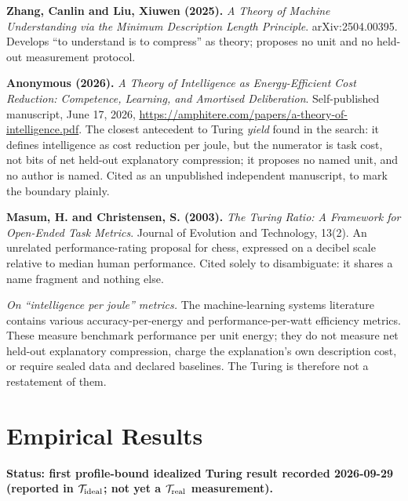 \documentclass[11pt]{article}
\begin{document}
\textbf{Zhang, Canlin and Liu, Xiuwen (2025).} \textit{A Theory of Machine Understanding via the Minimum Description Length Principle}. arXiv:2504.00395. Develops ``to understand is to compress'' as theory; proposes no unit and no held-out measurement protocol.

\textbf{Anonymous (2026).} \textit{A Theory of Intelligence as Energy-Efficient Cost Reduction: Competence, Learning, and Amortised Deliberation}. Self-published manuscript, June 17, 2026, \url{https://amphitere.com/papers/a-theory-of-intelligence.pdf}. The closest antecedent to Turing \textit{yield} found in the search: it defines intelligence as cost reduction per joule, but the numerator is task cost, not bits of net held-out explanatory compression; it proposes no named unit, and no author is named. Cited as an unpublished independent manuscript, to mark the boundary plainly.

\textbf{Masum, H. and Christensen, S. (2003).} \textit{The Turing Ratio: A Framework for Open-Ended Task Metrics}. Journal of Evolution and Technology, 13(2). An unrelated performance-rating proposal for chess, expressed on a decibel scale relative to median human performance. Cited solely to disambiguate: it shares a name fragment and nothing else.

\textit{On ``intelligence per joule'' metrics.} The machine-learning systems literature contains various accuracy-per-energy and performance-per-watt efficiency metrics. These measure benchmark performance per unit energy; they do not measure net held-out explanatory compression, charge the explanation's own description cost, or require sealed data and declared baselines. The Turing is therefore not a restatement of them.

\section{Empirical Results}

\textbf{Status: first profile-bound idealized Turing result recorded 2026-09-29 (reported in \(\mathcal{T}_{\rm ideal}\); not yet a \(\mathcal{T}_{\rm real}\) measurement).}
\end{document}
